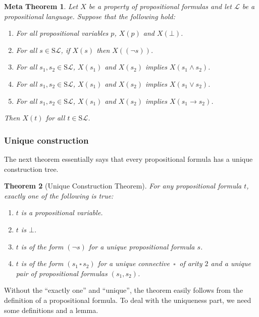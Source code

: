 \documentclass[11pt]{article}
\newcommand{\PF}{\mathrm{S}}
\newtheorem{theorem}{Theorem}[section]
\newtheorem{metatheorem}[theorem]{Meta Theorem}
\newcommand{\mcal}[1]{\mathcal{#1}}
\newcommand{\conn}{\,\square\,}
\begin{document}
\begin{metatheorem}
Let $X$ be a property of propositional formulas and let $\mcal{L}$ be a propositional language. Suppose that the following hold:
\begin{enumerate}
\item For all propositional variables $p$, $X(p)$ and $X(\bot)$.
\item For all $s\in\PF\mcal{L}$, if $X(s)$ then $X((\neg s))$.
\item For all $s_1,s_2\in\PF\mcal{L}$, $X(s_1)$ and $X(s_2)$ implies $X(s_1\wedge s_2)$.
\item For all $s_1,s_2\in\PF\mcal{L}$, $X(s_1)$ and $X(s_2)$ implies $X(s_1\vee s_2)$.
\item For all $s_1,s_2\in\PF\mcal{L}$, $X(s_1)$ and $X(s_2)$ implies $X(s_1\rightarrow s_2)$.
\end{enumerate}

Then $X(t)$ for all $t\in \PF\mcal{L}$.

\end{metatheorem}

\subsubsection*{Unique construction}

The next theorem essentially says that every propositional formula has a unique construction tree.

\begin{theorem}[Unique Construction Theorem]\label{UCProp}
For any propositional formula $t$, exactly one of the following is true:
\begin{enumerate}
\item $t$ is a propositional variable.
\item $t$ is $\bot$.
\item $t$ is of the form $(\neg s)$ for a unique propositional formula $s$.
\item $t$ is of the form $(s_1\conn s_2)$ for a unique connective $\conn$ of arity $2$ and a unique pair of propositional formulas $(s_1,s_2)$.
\end{enumerate}
\end{theorem}

Without the ``exactly one'' and ``unique'', the theorem easily follows from the definition of a propositional formula. To deal with the uniqueness part, we need some definitions and a lemma.
\end{document}
